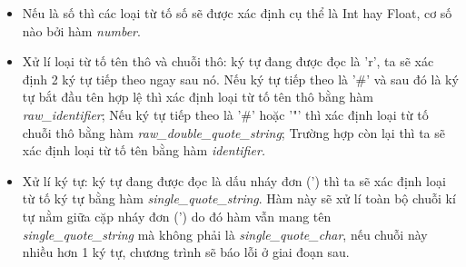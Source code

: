 \begin{itemize}
  
  
  
  \item Nếu là số thì các loại từ tố số sẽ được xác định cụ thể là Int hay Float, cơ số nào bởi hàm \textit{number}.
  
  
  
  
  \item Xử lí loại từ tố tên thô và chuỗi thô: ký tự đang được đọc là 'r', ta sẽ xác định 2 ký tự tiếp theo ngay sau nó. Nếu ký tự tiếp theo là '\#' và sau đó là ký tự bắt đầu tên hợp lệ thì xác định loại từ tố tên thô bằng hàm \textit{raw\_identifier}; Nếu ký tự tiếp theo là '\#' hoặc '"' thì xác định loại từ tố chuỗi thô bằng hàm \textit{raw\_double\_quote\_string}; Trường hợp còn lại thì ta sẽ xác định loại từ tố tên bằng hàm \textit{identifier.}
  
  

  
  \item Xử lí ký tự: ký tự đang được đọc là dấu nháy đơn (') thì ta sẽ xác định loại từ tố ký tự bằng hàm \textit{single\_quote\_string}. Hàm này sẽ xử lí toàn bộ chuỗi kí tự nằm giữa cặp nháy đơn (') do đó hàm vẫn mang tên \\\textit{single\_quote\_string} mà không phải là \textit{single\_quote\_char}, nếu chuỗi này nhiều hơn 1 ký tự, chương trình sẽ báo lỗi ở giai đoạn sau.
  

\end{itemize}
